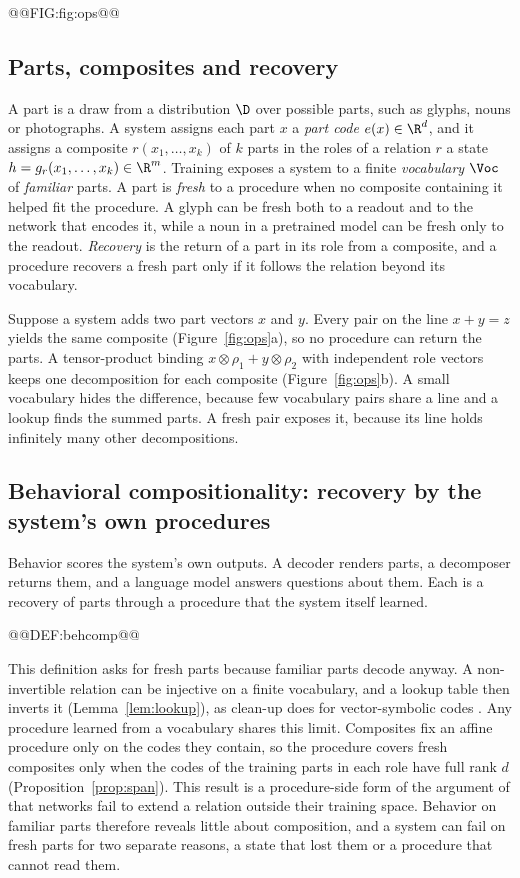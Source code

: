 @@FIG:fig:ops@@

\subsection{Parts, composites and recovery}
\label{sec:intuition}

A part is a draw from a distribution $\D$ over possible parts, such as glyphs, nouns or photographs. A system assigns each part $x$ a \emph{part code} $e(x) \in \R^d$, and it assigns a composite $r(x_1, \ldots, x_k)$ of $k$ parts in the roles of a relation $r$ a state $h = g_r(x_1, \ldots, x_k) \in \R^m$. Training exposes a system to a finite \emph{vocabulary} $\Voc$ of \emph{familiar} parts. A part is \emph{fresh} to a procedure when no composite containing it helped fit the procedure. A glyph can be fresh both to a readout and to the network that encodes it, while a noun in a pretrained model can be fresh only to the readout. \emph{Recovery} is the return of a part in its role from a composite, and a procedure recovers a fresh part only if it follows the relation beyond its vocabulary.

Suppose a system adds two part vectors $x$ and $y$. Every pair on the line $x + y = z$ yields the same composite (Figure~\ref{fig:ops}a), so no procedure can return the parts. A tensor-product binding $x \otimes \rho_1 + y \otimes \rho_2$ with independent role vectors keeps one decomposition for each composite (Figure~\ref{fig:ops}b). A small vocabulary hides the difference, because few vocabulary pairs share a line and a lookup finds the summed parts. A fresh pair exposes it, because its line holds infinitely many other decompositions.

\subsection{Behavioral compositionality: recovery by the system's own procedures}
\label{sec:notions}

Behavior scores the system's own outputs. A decoder renders parts, a decomposer returns them, and a language model answers questions about them. Each is a recovery of parts through a procedure that the system itself learned.

@@DEF:behcomp@@

This definition asks for fresh parts because familiar parts decode anyway. A non-invertible relation can be injective on a finite vocabulary, and a lookup table then inverts it (Lemma~\ref{lem:lookup}), as clean-up does for vector-symbolic codes \citep{plate2003,frady2018}. Any procedure learned from a vocabulary shares this limit. Composites fix an affine procedure only on the codes they contain, so the procedure covers fresh composites only when the codes of the training parts in each role have full rank $d$ (Proposition~\ref{prop:span}). This result is a procedure-side form of the argument of \citet{marcus1998} that networks fail to extend a relation outside their training space. Behavior on familiar parts therefore reveals little about composition, and a system can fail on fresh parts for two separate reasons, a state that lost them or a procedure that cannot read them.

